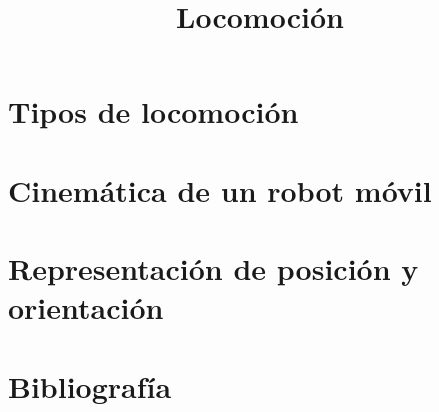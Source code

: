 \documentclass[compress]{beamer}
\title{Locomoción}
\author{}
\institute{Universidad Nacional de Rosario}
\date{}
\begin{document}
\frame{\titlepage}

\section{Tipos de locomoción}


\section{Cinemática de un robot móvil}


\section{Representación de posición y orientación}


\section{Bibliografía}

\end{document}
